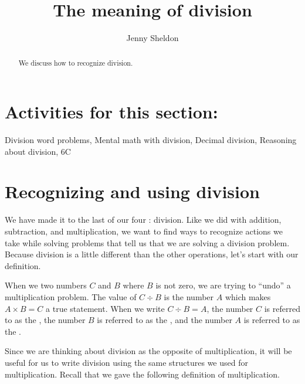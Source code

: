 \documentclass{ximera}
\title{The meaning of division}
\author{Jenny Sheldon}
\begin{document}
\begin{abstract}
We discuss how to recognize division.
\end{abstract}
\maketitle

\section{Activities for this section:} Division word problems, Mental math with division, Decimal division, Reasoning about division, 6C


\section{Recognizing and using division}
We have made it to the last of our four : division. Like we did with addition, subtraction, and multiplication, we want to find ways to recognize actions we take while solving problems that tell us that we are solving a division problem. Because division is a little different than the other operations, let's start with our definition.

\begin{definition}
When we  two numbers $C$ and $B$ where $B$ is not zero, we are trying to ``undo'' a multiplication problem. The value of $C \div B$ is the number $A$ which makes $A \times B = C$ a true statement. When we write $C \div B = A$, the number $C$ is referred to as the , the number $B$ is referred to as the , and the number $A$ is referred to as the . 

\begin{image}
\end{image}
\end{definition}

Since we are thinking about division as the opposite of multiplication, it will be useful for us to write division using the same structures we used for multiplication. Recall that we gave the following definition of multiplication.
\end{document}
